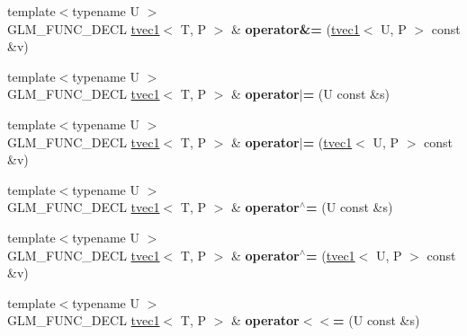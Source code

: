 \begin{DoxyCompactItemize}
\item 
\hypertarget{structglm_1_1tvec1_a672c44812f4806e389fd1ec24466b0d8}{{\footnotesize template$<$typename U $>$ }\\G\-L\-M\-\_\-\-F\-U\-N\-C\-\_\-\-D\-E\-C\-L \hyperlink{structglm_1_1tvec1}{tvec1}$<$ T, P $>$ \& {\bfseries operator\&=} (\hyperlink{structglm_1_1tvec1}{tvec1}$<$ U, P $>$ const \&v)}\label{structglm_1_1tvec1_a672c44812f4806e389fd1ec24466b0d8}

\item 
\hypertarget{structglm_1_1tvec1_a646f581788627976aceb40cb7ac3f32f}{{\footnotesize template$<$typename U $>$ }\\G\-L\-M\-\_\-\-F\-U\-N\-C\-\_\-\-D\-E\-C\-L \hyperlink{structglm_1_1tvec1}{tvec1}$<$ T, P $>$ \& {\bfseries operator$\vert$=} (U const \&s)}\label{structglm_1_1tvec1_a646f581788627976aceb40cb7ac3f32f}

\item 
\hypertarget{structglm_1_1tvec1_a6c8723729c52dbf1511bb50723f686c0}{{\footnotesize template$<$typename U $>$ }\\G\-L\-M\-\_\-\-F\-U\-N\-C\-\_\-\-D\-E\-C\-L \hyperlink{structglm_1_1tvec1}{tvec1}$<$ T, P $>$ \& {\bfseries operator$\vert$=} (\hyperlink{structglm_1_1tvec1}{tvec1}$<$ U, P $>$ const \&v)}\label{structglm_1_1tvec1_a6c8723729c52dbf1511bb50723f686c0}

\item 
\hypertarget{structglm_1_1tvec1_aed79da02faf88bada2d178bd2c2c9072}{{\footnotesize template$<$typename U $>$ }\\G\-L\-M\-\_\-\-F\-U\-N\-C\-\_\-\-D\-E\-C\-L \hyperlink{structglm_1_1tvec1}{tvec1}$<$ T, P $>$ \& {\bfseries operator$^\wedge$=} (U const \&s)}\label{structglm_1_1tvec1_aed79da02faf88bada2d178bd2c2c9072}

\item 
\hypertarget{structglm_1_1tvec1_abc6f6df2f1164cb293976e0418e44690}{{\footnotesize template$<$typename U $>$ }\\G\-L\-M\-\_\-\-F\-U\-N\-C\-\_\-\-D\-E\-C\-L \hyperlink{structglm_1_1tvec1}{tvec1}$<$ T, P $>$ \& {\bfseries operator$^\wedge$=} (\hyperlink{structglm_1_1tvec1}{tvec1}$<$ U, P $>$ const \&v)}\label{structglm_1_1tvec1_abc6f6df2f1164cb293976e0418e44690}

\item 
\hypertarget{structglm_1_1tvec1_accd381f8f7a416463983422443324826}{{\footnotesize template$<$typename U $>$ }\\G\-L\-M\-\_\-\-F\-U\-N\-C\-\_\-\-D\-E\-C\-L \hyperlink{structglm_1_1tvec1}{tvec1}$<$ T, P $>$ \& {\bfseries operator$<$$<$=} (U const \&s)}\label{structglm_1_1tvec1_accd381f8f7a416463983422443324826}


\end{DoxyCompactItemize}
